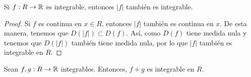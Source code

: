 \begin{colorary}
Si $\displaystyle f : R \to \mathbb{R} $ es integrable, entonces $\displaystyle \left|f\right| $ también es integrable.
\end{colorary}

\begin{proof}
Si $\displaystyle f $ es continua en $\displaystyle x \in R $, entonces $\displaystyle \left|f\right| $ también es continua en $\displaystyle x $. De esta manera, tenemos que $\displaystyle D\left( \left|f\right|\right)\subset D\left(f\right) $. Así, como $\displaystyle D\left(f\right) $ tiene medida nula y tenemos que $\displaystyle D\left( \left|f\right|\right) $ también tiene medida nula, por lo que $\displaystyle \left|f\right| $ también es integrable en $\displaystyle R $.
\end{proof}

\begin{colorary}
Sean $\displaystyle f,g : R \to \mathbb{R} $ integrables. Entonces, $\displaystyle f + g $ es integrable en $\displaystyle R $.
\end{colorary}

